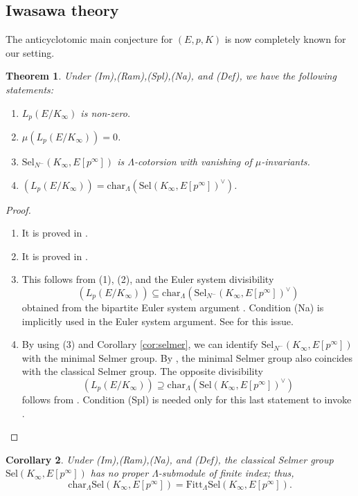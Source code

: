 \documentclass[11pt]{amsart}
\numberwithin{equation}{section}
\newtheorem{thm}{Theorem}[section]
\newtheorem{cor}[thm]{Corollary}
\theoremstyle{definition}
\begin{document}
\subsection{Iwasawa theory}
The anticyclotomic main conjecture for $(E,p, K)$ is now completely known for our setting. 
\begin{thm} \label{thm:main-conj}
Under (Im),(Ram),(Spl),(Na), and (Def), we have the following statements:
\begin{enumerate}
\item $L_p(E/K_\infty)$ is non-zero.
\item $\mu(L_p(E/K_\infty))= 0 $.
\item $\mathrm{Sel}_{N^-}(K_\infty, E[p^\infty])$ is $\Lambda$-cotorsion with vanishing of $\mu$-invariants.
\item $\left( L_p(E/K_\infty) \right) = \mathrm{char}_\Lambda \left( \mathrm{Sel}(K_\infty, E[p^\infty])^\vee \right)$.
\end{enumerate}
\end{thm}
\begin{proof}
\begin{enumerate}
\item It is proved in \cite{vatsal-uniform}.
\item It is proved in \cite{vatsal-duke}.
\item This follows from (1), (2), and the Euler system divisibility
$$\left( L_p(E/K_\infty) \right) \subseteq \mathrm{char}_\Lambda \left( \mathrm{Sel}_{N^-}(K_\infty, E[p^\infty])^\vee \right)$$
obtained from the bipartite Euler system argument \cite{bertolini-darmon-imc-2005, pw-mu}.
Condition (Na) is implicitly used in the Euler system argument. See \cite[Assu. 1.1 and Rem. 1.4]{kim-pollack-weston} for this issue. 
\item By using (3) and Corollary \ref{cor:selmer}, we can identify $\mathrm{Sel}_{N^-}(K_\infty, E[p^\infty])$ with the minimal Selmer group. By \cite[Prop. 2.1]{greenberg-lnm}, the minimal Selmer group also coincides with the classical Selmer group.
The opposite divisibility 
$$\left( L_p(E/K_\infty) \right) \supseteq \mathrm{char}_\Lambda \left( \mathrm{Sel}(K_\infty, E[p^\infty])^\vee \right)$$
follows from \cite{skinner-urban}.
Condition (Spl) is needed only for this last statement to invoke \cite{skinner-urban}.
\end{enumerate}
\end{proof}
\begin{cor} \label{cor:no-finite}
Under (Im),(Ram),(Na), and (Def), the classical Selmer group $\mathrm{Sel}(K_\infty, E[p^\infty])$ has no proper $\Lambda$-submodule of finite index; thus, 
$$\mathrm{char}_{\Lambda} \mathrm{Sel}(K_\infty, E[p^\infty]) = \mathrm{Fitt}_{\Lambda} \mathrm{Sel}(K_\infty, E[p^\infty]) .$$
\end{cor}
\end{document}
